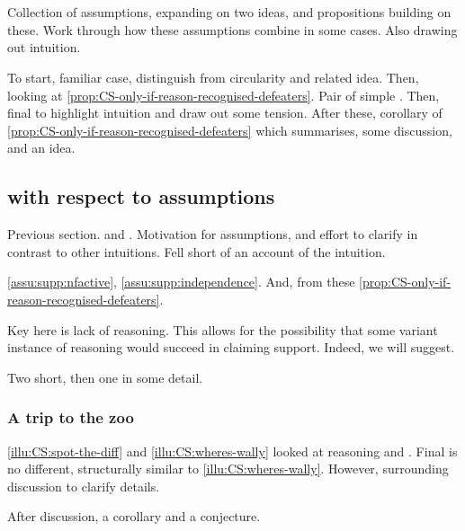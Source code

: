 \section{}
\label{sec:CS:illustrations}

\begin{note}
  Collection of assumptions, expanding on two ideas, and propositions building on these.
  Work through how these assumptions combine in some cases.
  Also drawing out intuition.

  To start, familiar case, distinguish from circularity and related idea.
  Then, looking at \autoref{prop:CS-only-if-reason-recognised-defeaters}.
  Pair of simple .
  Then, final  to highlight intuition and draw out some tension.
  After these, corollary of \autoref{prop:CS-only-if-reason-recognised-defeaters} which summarises, some discussion, and an idea.
\end{note}


\subsection{ with respect to assumptions}
\label{sec:illustrations-wrt-assumption}

\begin{note}
  Previous section.
  \ideaS{} and \ideaCS{}.
  Motivation for assumptions, and effort to clarify in contrast to other intuitions.
  Fell short of an account of the intuition.

  \autoref{assu:supp:nfactive}, \autoref{assu:supp:independence}.
  And, from these \autoref{prop:CS-only-if-reason-recognised-defeaters}.

  Key here is lack of reasoning.
  This allows for the possibility that some variant instance of reasoning would succeed in claiming support.
  Indeed, we will suggest.
\end{note}

\begin{note}
  Two short, then one in some detail.
\end{note}



\subsubsection{A trip to the zoo}

\begin{note}
   \ref{illu:CS:spot-the-diff} and \ref{illu:CS:wheres-wally} looked at reasoning and .
  Final  is no different, structurally similar to \autoref{illu:CS:wheres-wally}.
  However, surrounding discussion to clarify details.

  After discussion, a corollary and a conjecture.
\end{note}

